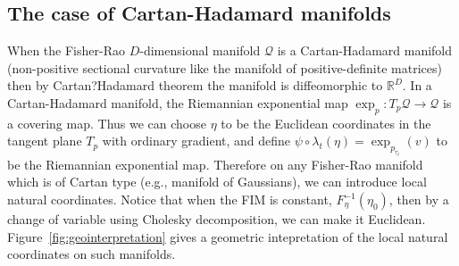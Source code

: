 \documentclass{article}
\begin{document}
\subsection{The case of Cartan-Hadamard manifolds}
When the Fisher-Rao $D$-dimensional manifold $\mathcal{Q}$ is a Cartan-Hadamard manifold (non-positive sectional curvature like the manifold of positive-definite matrices)
then by Cartan?Hadamard theorem the manifold is diffeomorphic to $\mathbb{R}^D$.
In a Cartan-Hadamard manifold, the Riemannian exponential map $\exp_p:T_p\mathcal{Q}\rightarrow\mathcal{Q}$ is a covering map.
Thus we can choose $\eta$ to be the Euclidean coordinates in the tangent plane $T_p$ with ordinary gradient, and define $\psi\circ\lambda_t(\eta)=\exp_{p_{\tau_t}}(v)$ to be the Riemannian exponential map. 
Therefore on any  Fisher-Rao manifold which is of Cartan type (e.g., manifold of Gaussians), we can introduce local natural coordinates.
Notice that when the FIM is constant, $F_\eta^{-1}(\eta_0)$, then by a change of variable using Cholesky decomposition, we can make it 
 Euclidean. Figure~\ref{fig:geointerpretation} gives a geometric intepretation of the local natural coordinates on such manifolds.
\end{document}
